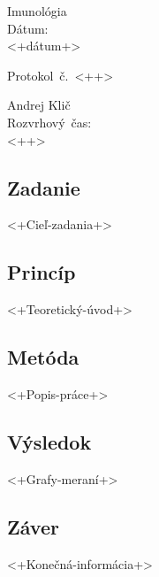 \documentclass[paper=a4,fontsize=12pt]{scrartcl}
\begin{document}
\noindent
\begin{minipage}{0.3\textwidth}
Imunológia \\
Dátum: \\
<+dátum+> 
\end{minipage}
\begin{minipage}{0.38\textwidth}
\begin{center}
\Large{Protokol~č.~<++>}
\end{center}
\end{minipage}
\begin{minipage}{0.30\textwidth}
\begin{flushright}
Andrej Klič \\
Rozvrhový~čas: \\
<++> 
\end{flushright}
\end{minipage}

\subsection*{Zadanie}
<+Cieľ-zadania+>

\subsection*{Princíp}
<+Teoretický-úvod+>

\subsection*{Metóda}
<+Popis-práce+>

\subsection*{Výsledok}
<+Grafy-meraní+>

\subsection*{Záver}
<+Konečná-informácia+>


\end{document}

